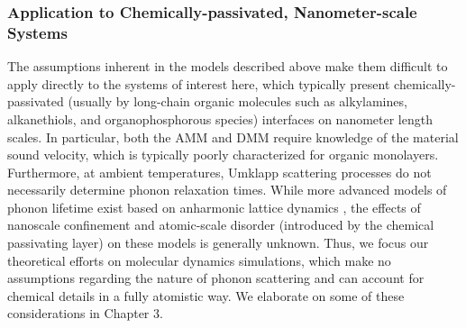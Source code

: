 \subsubsection{Application to Chemically-passivated, Nanometer-scale Systems}
The assumptions inherent in the models described above make them difficult to apply directly to the systems of interest here, which typically present chemically-passivated (usually by long-chain organic molecules such as alkylamines, alkanethiols, and organophosphorous species) interfaces on nanometer length scales. In particular, both the AMM and DMM require knowledge of the material sound velocity, which is typically poorly characterized for organic monolayers. Furthermore, at ambient temperatures, Umklapp scattering processes do not necessarily determine phonon relaxation times. While more advanced models of phonon lifetime exist based on anharmonic lattice dynamics \cite{PhysRevB.80.165304}, the effects of nanoscale confinement and atomic-scale disorder (introduced by the chemical passivating layer) on these models is generally unknown. Thus, we focus our theoretical efforts on molecular dynamics simulations, which make no assumptions regarding the nature of phonon scattering and can account for chemical details in a fully atomistic way. We elaborate on some of these considerations in Chapter 3.
